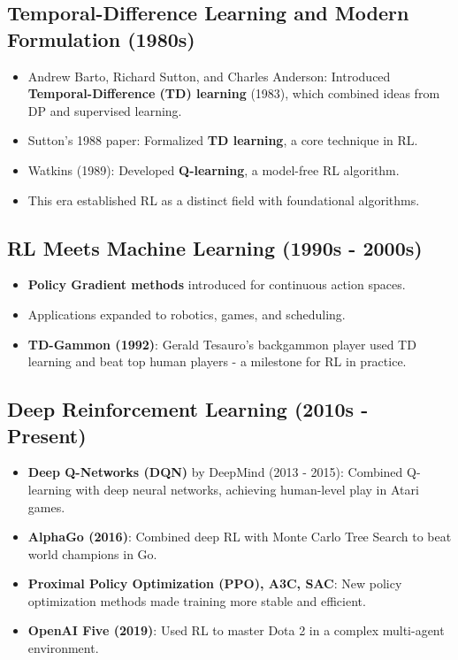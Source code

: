 \documentclass[10pt]{article}
\begin{document}
\subsection*{Temporal-Difference Learning and Modern Formulation (1980s)}
\begin{itemize}
	\item Andrew Barto, Richard Sutton, and Charles Anderson: Introduced \textbf{Temporal-Difference (TD) learning} (1983), which combined ideas from DP and supervised learning.
	\item Sutton's 1988 paper: Formalized \textbf{TD learning}, a core technique in RL.
	\item Watkins (1989): Developed \textbf{Q-learning}, a model-free RL algorithm.
	\item This era established RL as a distinct field with foundational algorithms.
\end{itemize}

\subsection*{RL Meets Machine Learning (1990s - 2000s)}
\begin{itemize}
	\item \textbf{Policy Gradient methods} introduced for continuous action spaces.
	\item Applications expanded to robotics, games, and scheduling.
	\item \textbf{TD-Gammon (1992)}: Gerald Tesauro's backgammon player used TD learning and beat top human players - a milestone for RL in practice.
\end{itemize}

\subsection*{Deep Reinforcement Learning (2010s - Present)}
\begin{itemize}
	\item \textbf{Deep Q-Networks (DQN)} by DeepMind (2013 - 2015): Combined Q-learning with deep neural networks, achieving human-level play in Atari games.
	\item \textbf{AlphaGo (2016)}: Combined deep RL with Monte Carlo Tree Search to beat world champions in Go.
	\item \textbf{Proximal Policy Optimization (PPO), A3C, SAC}: New policy optimization methods made training more stable and efficient.
	\item \textbf{OpenAI Five (2019)}: Used RL to master Dota 2 in a complex multi-agent environment.
\end{itemize}
\end{document}
